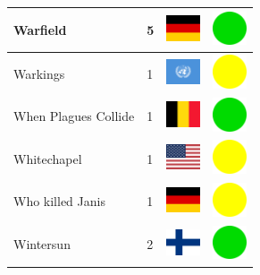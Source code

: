 \documentclass[12pt, a4paper, twoside]{report}
\begin{document}
\begin{center}
\begin{longtable}{|p{5cm}|p{2cm}|p{2cm}|p{2cm}|}
			Warfield & 5 & \includegraphics[width=1cm]{4x3/de} & \includegraphics[width=1cm]{likes/y} \\ \hline
			Warkings & 1 & \includegraphics[width=1cm]{4x3/un} & \includegraphics[width=1cm]{likes/m} \\ \hline
			When Plagues Collide & 1 & \includegraphics[width=1cm]{4x3/be} & \includegraphics[width=1cm]{likes/y} \\ \hline
			Whitechapel & 1 & \includegraphics[width=1cm]{4x3/us} & \includegraphics[width=1cm]{likes/m} \\ \hline
			Who killed Janis & 1 & \includegraphics[width=1cm]{4x3/de} & \includegraphics[width=1cm]{likes/m} \\ \hline
			Wintersun & 2 & \includegraphics[width=1cm]{4x3/fi} & \includegraphics[width=1cm]{likes/y} \\ \hline

\end{longtable}
\end{center}
\end{document}
